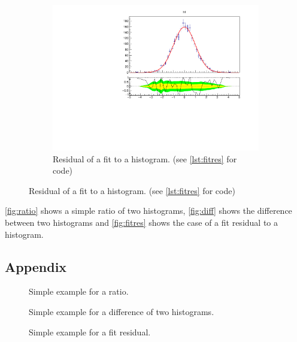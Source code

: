 \begin{figure}
\begin{subfigure}{0.5\linewidth}
    \includegraphics[width=1.0\linewidth]{assets/single.pdf} 
    \caption{Residual of a fit to a histogram. (see \autoref{lst:fitres} for code)}
    \label{fig:fitres}
  \end{subfigure}
\end{figure}

\autoref{fig:ratio} shows a simple ratio of two histograms, \autoref{fig:diff} shows the difference
between two histograms and \autoref{fig:fitres} shows the case of a fit residual to a histogram.


\clearpage

\begin{appendix}
  \section{Appendix}
  \begin{figure}[h]
    
    \caption{Simple example for a ratio.}
    \label{lst:ratio}
  \end{figure}
  
  \begin{figure}[h]
    
    \caption{Simple example for a difference of two histograms.}
    \label{lst:diff}
  \end{figure}
  
  \begin{figure}[h]
    
    \caption{Simple example for a fit residual.}
    \label{lst:fitres}
  \end{figure}
  \printbibliography
\end{appendix}
